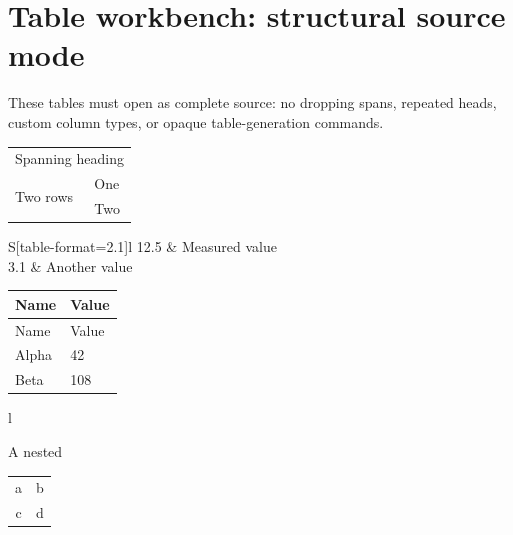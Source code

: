 \documentclass{article}
\begin{document}
\section*{Table workbench: structural source mode}
These tables must open as complete source: no dropping spans, repeated heads,
custom column types, or opaque table-generation commands.

\begin{tabular}{ll}
\multicolumn{2}{c}{Spanning heading} \\
\multirow{2}{*}{Two rows} & One \\
 & Two \\
\end{tabular}

\begin{tabular}{S[table-format=2.1]l}
12.5 & Measured value \\
3.1 & Another value \\
\end{tabular}

\begin{longtable}{ll}
\toprule
Name & Value \\
\endfirsthead
Name & Value \\
\endhead
\bottomrule
\endfoot
Alpha & 42 \\
Beta & 108 \\
\end{longtable}

\begin{tabular}{l}
{A nested \begin{tabular}{cc}a & b \\ c & d\end{tabular}} \\
\end{tabular}
\end{document}
